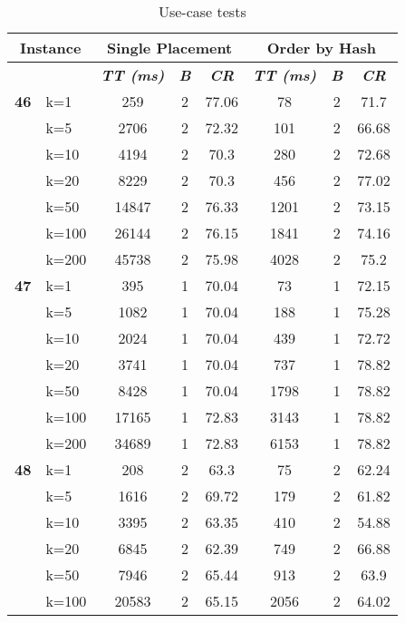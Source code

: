     \begin{table}[htbp]
    \caption{Use-case tests}
    \begin{tabular}{|l|l|c|c|c|c|c|c|}
    
    \multicolumn{ 2}{|c|}{\textbf{Instance}} & \multicolumn{ 3}{c|}{\textbf{Single Placement}} & \multicolumn{ 3}{c|}{\textbf{Order by Hash}} \\ \hline
    \multicolumn{ 2}{|l|}{} & \textbf{\textit{TT (ms)}} & \textbf{\textit{B}} & \textbf{\textit{CR}} & \textbf{\textit{TT (ms)}} & \textbf{\textit{B}} & \textbf{\textit{CR}} \\ \hline
    \multicolumn{1}{|r|}{\textbf{46}} & k=1 & 259 & 2 & 77.06 & 78 & 2 & 71.7 \\ 
     & k=5 & 2706 & 2 & 72.32 & 101 & 2 & 66.68 \\ 
     & k=10 & 4194 & 2 & 70.3 & 280 & 2 & 72.68 \\ 
     & k=20 & 8229 & 2 & 70.3 & 456 & 2 & 77.02 \\ 
     & k=50 & 14847 & 2 & 76.33 & 1201 & 2 & 73.15 \\ 
     & k=100 & 26144 & 2 & 76.15 & 1841 & 2 & 74.16 \\ 
     & k=200 & 45738 & 2 & 75.98 & 4028 & 2 & 75.2 \\ \hline
    \multicolumn{1}{|r|}{\textbf{47}} & k=1 & 395 & 1 & 70.04 & 73 & 1 & 72.15 \\ 
     & k=5 & 1082 & 1 & 70.04 & 188 & 1 & 75.28 \\ 
     & k=10 & 2024 & 1 & 70.04 & 439 & 1 & 72.72 \\ 
     & k=20 & 3741 & 1 & 70.04 & 737 & 1 & 78.82 \\ 
     & k=50 & 8428 & 1 & 70.04 & 1798 & 1 & 78.82 \\ 
     & k=100 & 17165 & 1 & 72.83 & 3143 & 1 & 78.82 \\ 
     & k=200 & 34689 & 1 & 72.83 & 6153 & 1 & 78.82 \\ \hline
    \multicolumn{1}{|r|}{\textbf{48}} & k=1 & 208 & 2 & 63.3 & 75 & 2 & 62.24 \\ 
     & k=5 & 1616 & 2 & 69.72 & 179 & 2 & 61.82 \\ 
     & k=10 & 3395 & 2 & 63.35 & 410 & 2 & 54.88 \\ 
     & k=20 & 6845 & 2 & 62.39 & 749 & 2 & 66.88 \\ 
     & k=50 & 7946 & 2 & 65.44 & 913 & 2 & 63.9 \\ 
     & k=100 & 20583 & 2 & 65.15 & 2056 & 2 & 64.02 \\ 

\end{tabular}
\end{table}
